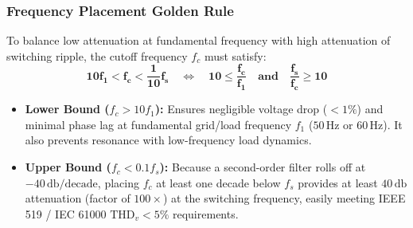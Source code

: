 \subsubsection{Frequency Placement Golden Rule}
To balance low attenuation at fundamental frequency with high attenuation of switching ripple, the cutoff frequency $f_c$ must satisfy:
\begin{equation}
\label{eq:filter_placement_rule}
\mathbf{10 f_1 < f_c < \frac{1}{10} f_s \quad \iff \quad 10 \le \frac{f_c}{f_1} \quad \text{and} \quad \frac{f_s}{f_c} \ge 10}
\end{equation}
\begin{itemize}
  \item \textbf{Lower Bound ($f_c > 10 f_1$):} Ensures negligible voltage drop ($< 1\%$) and minimal phase lag at fundamental grid/load frequency $f_1$ ($50\,\si{\hertz}$ or $60\,\si{\hertz}$). It also prevents resonance with low-frequency load dynamics.
  \item \textbf{Upper Bound ($f_c < 0.1 f_s$):} Because a second-order filter rolls off at $-40\,\si{\decibel}/\text{decade}$, placing $f_c$ at least one decade below $f_s$ provides at least $40\,\si{\decibel}$ attenuation (factor of $100\times$) at the switching frequency, easily meeting IEEE 519 / IEC 61000 $\mathrm{THD}_v < 5\%$ requirements.
\end{itemize}

